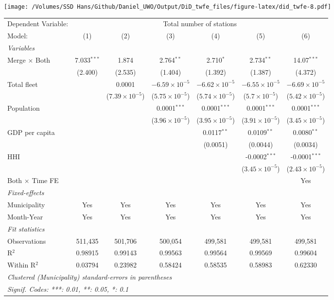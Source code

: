 \documentclass[
]{article}
\begin{document}
\texttt{[image: /Volumes/SSD Hans/Github/Daniel\_UWO/Output/DiD\_twfe\_files/figure-latex/did\_twfe-8.pdf]}

\begin{tabular}{lcccccc}
\tabularnewline\midrule\midrule
Dependent Variable:&\multicolumn{6}{c}{Total number of stations}\\
Model:&(1) & (2) & (3) & (4) & (5) & (6)\\
\midrule \emph{Variables}&   &   &   &   &   &  \\
Merge $\times $ Both & 7.033$^{***}$ & 1.874 & 2.764$^{**}$ & 2.710$^{*}$ & 2.734$^{**}$ & 14.07$^{***}$\\
  &(2.400) & (2.535) & (1.404) & (1.392) & (1.387) & (4.372)\\
Total fleet &    & 0.0001 & $-6.59\times 10^{-5}$ & $-6.62\times 10^{-5}$ & $-6.55\times 10^{-5}$ & $-6.69\times 10^{-5}$\\
  &   & ($7.39\times 10^{-5}$) & ($5.75\times 10^{-5}$) & ($5.74\times 10^{-5}$) & ($5.7\times 10^{-5}$) & ($5.42\times 10^{-5}$)\\
Population &    &    & 0.0001$^{***}$ & 0.0001$^{***}$ & 0.0001$^{***}$ & 0.0001$^{***}$\\
  &   &    & ($3.96\times 10^{-5}$) & ($3.95\times 10^{-5}$) & ($3.91\times 10^{-5}$) & ($3.45\times 10^{-5}$)\\
GDP per capita &    &    &    & 0.0117$^{**}$ & 0.0109$^{**}$ & 0.0080$^{**}$\\
  &   &    &    & (0.0051) & (0.0044) & (0.0034)\\
HHI &    &    &    &    & -0.0002$^{***}$ & -0.0001$^{***}$\\
  &   &    &    &    & ($3.45\times 10^{-5}$) & ($2.43\times 10^{-5}$)\\
Both $\times$ Time FE &  &  &  &  &  & Yes\\
\midrule \emph{Fixed-effects}&   &   &   &   &   &  \\
Municipality & Yes & Yes & Yes & Yes & Yes & Yes\\
Month-Year & Yes & Yes & Yes & Yes & Yes & Yes\\
\midrule \emph{Fit statistics}&  & & & & & \\
Observations & 511,435&501,706&500,054&499,581&499,581&499,581\\
R$^2$ & 0.98915&0.99143&0.99563&0.99564&0.99569&0.99604\\
Within R$^2$ & 0.03794&0.23982&0.58424&0.58535&0.58983&0.62330\\
\midrule\midrule\multicolumn{7}{l}{\emph{Clustered (Municipality) standard-errors in parentheses}}\\
\multicolumn{7}{l}{\emph{Signif. Codes: ***: 0.01, **: 0.05, *: 0.1}}\\
\end{tabular}
\end{document}
